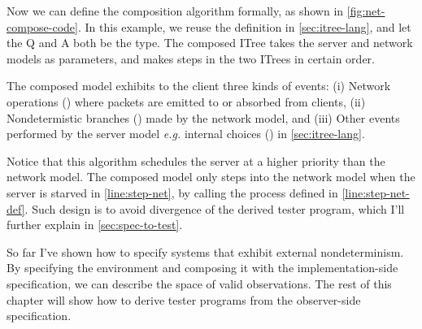 Now we can define the composition algorithm formally, as shown in
\autoref{fig:net-compose-code}.  In this example, we reuse the 
definition in \autoref{sec:itree-lang}, and let the \ilc Q and \ilc A both be
the  type.  The composed ITree takes the server and network models
as parameters, and makes steps in the two ITrees in certain order.

The composed model exhibits to the client three kinds of events: (i) Network
operations () where packets are emitted to or absorbed from clients,
(ii) Nondetermistic branches () made by the network model, and
(iii) Other events  performed by the server model {\it e.g.} internal
choices () in \autoref{sec:itree-lang}.

Notice that this algorithm schedules the server at a higher priority than the
network model.  The composed model only steps into the network model when the
server is starved in \autoref{line:step-net}, by calling the 
process defined in \autoref{line:step-net-def}.  Such design is to avoid
divergence of the derived tester program, which I'll further explain in
\autoref{sec:spec-to-test}.

So far I've shown how to specify systems that exhibit external nondeterminism.
By specifying the environment and composing it with the implementation-side
specification, we can describe the space of valid observations.  The rest of
this chapter will show how to derive tester programs from the observer-side
specification.
